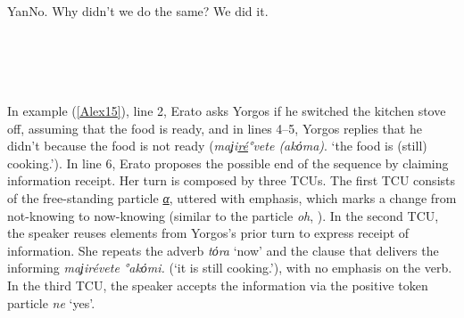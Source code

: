 \documentclass[output=paper]{LSP/langsci}
\begin{document}
\begin{Transcript}[FS {>}{>\hspace{0.2in}}]{Yan}{No. Why didn’t we do the same? We did it.}%
\label{Alex14}%
\\
\\
\\
\\ 
 \\
\end{Transcript}


In example (\ref{Alex15}), line 2, Erato asks Yorgos if he switched the kitchen stove off, assuming that the food is ready, and in lines 4--5, Yorgos replies that he didn’t because the food is not ready (\textit{maʝi\underline{ré}°vete (akόma)}. `the food is (still) cooking.'). In line 6, Erato proposes the possible end of the sequence by claiming information receipt. Her turn is composed by three TCUs. The first TCU consists of the free-standing particle \textit{\underline{α}}, uttered with emphasis, which marks a change from not-knowing to now-knowing (similar to the  particle \textit{oh}, \citealt{heritage1984}). In the second TCU, the speaker reuses elements from Yorgos’s prior turn to express receipt of information. She repeats the adverb \textit{tόra} `now' and the clause that delivers the informing \textit{maʝirévete °akόmi.} (`it is still cooking.'), with no emphasis on the verb. In the third TCU, the speaker accepts the information via the positive token particle \textit{ne} `yes'. 
\end{document}
